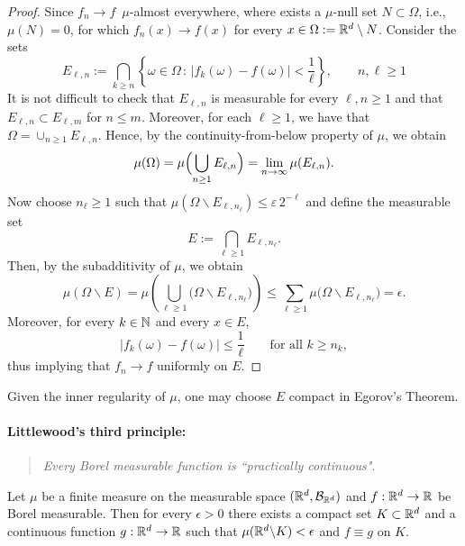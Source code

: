 \begin{proof}
	Since $f_n\to f$\, $\mu$-almost everywhere, where exists a $\mu$-null set $N\subset\Omega$, i.e., $\mu(N)=0$, for which $f_n(x)\to f(x)$ for every $x\in \Omega:=\mathbb R^d\setminus N$. Consider the sets
	\[
		E_{\ell,n} := \bigcap_{k\ge n} \left\{ \omega\in \Omega\,:\, |f_k(\omega)-f(\omega)| < \frac{1}{\ell}\right\},\qquad n,\ell\ge 1
	\]
	It is not difficult to check that $E_{\ell,n}$ is measurable for every $\ell,n\ge 1$ and that $E_{\ell,n}\subset E_{\ell,m}$ for $n\le m$. Moreover, for each $\ell\ge 1$, we have that $\Omega = \cup_{n\ge 1} E_{\ell,n}$. Hence, by the continuity-from-below property of $\mu$, we obtain
	\[
		\mu(\Omega) = \mu\Bigl(\bigcup_{n\ge 1} E_{\ell,n}\Bigr) = \lim_{n\to\infty} \mu(E_{\ell,n}).
	\]
	Now choose $n_\ell\ge 1$ such that $\mu(\Omega\backslash E_{\ell,n_\ell}) \le \varepsilon\,2^{-\ell}$ and define the measurable set
	\[
		E := \bigcap_{\ell\ge 1} E_{\ell,n_\ell}.
	\]
	Then, by the subadditivity of $\mu$, we obtain
	\[
		\mu(\Omega\backslash E) = \mu\left(\bigcup_{\ell\ge 1}\bigl(\Omega\backslash E_{\ell,n_\ell}\bigr)\right) \le \sum_{\ell\ge 1} \mu\bigl(\Omega\backslash E_{\ell,n_\ell}\bigr) = \epsilon.
	\]
	Moreover, for every $k \in \mathbb N$ and every $x \in E$,
	\[
		|f_k(\omega) - f(\omega)| \leq \frac{1}{\ell}\qquad\text{for all $k\ge n_k$},
	\]
	thus implying that $f_n \to f$ uniformly on $E$.
\end{proof}

\begin{remark}
	Given the inner regularity of $\mu$, one may choose $E$ compact in Egorov's Theorem. 
\end{remark}

\paragraph{Littlewood's third principle:} 
\begin{quotation}
	\emph{Every Borel measurable function is ``practically continuous"}.	
\end{quotation}

\begin{theorem}\label{thm:lusin}
    Let $\mu$ be a finite measure on the measurable space $(\mathbb R^d, \mathcal B_{\mathbb R^d})$ and $f: \mathbb R^d \to \mathbb R$ be Borel measurable. 
	Then for every $\epsilon > 0$ there exists a compact set $K \subset \mathbb R^d$ and a continuous function $g: \mathbb R^d \to \mathbb R$ such that $\mu(\mathbb R^d \backslash K) < \epsilon$ and $f \equiv g$ on $K$.
\end{theorem}

